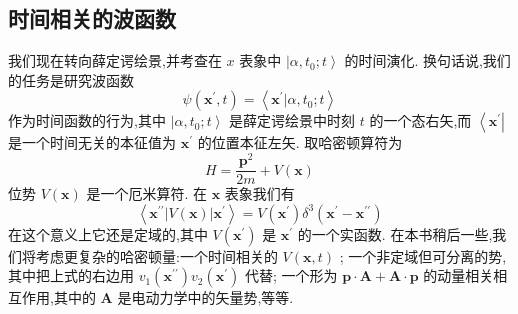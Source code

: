 \documentclass[lang=cn,newtx,10pt,scheme=chinese,thmcnt=section]{elegantbook}
\begin{document}
\subsection*{时间相关的波函数}
我们现在转向薛定谔绘景,并考查在 $x$ 表象中 $\left| {\alpha ,{t}_{0};t}\right\rangle$ 的时间演化. 换句话说,我们的任务是研究波函数
\begin{equation}
	\psi \left( {{\mathbf{x}}^{\prime }, t}\right) = \left\langle {{\mathbf{x}}^{\prime } | \alpha ,{t}_{0};t}\right\rangle
\end{equation}
作为时间函数的行为,其中 $\left| {\alpha ,{t}_{0};t}\right\rangle$ 是薛定谔绘景中时刻 $t$ 的一个态右矢,而 $\left\langle {\mathbf{x}}^{\prime }\right|$ 是一个时间无关的本征值为 ${\mathbf{x}}^{\prime }$ 的位置本征左矢. 取哈密顿算符为
\begin{equation}
	H = \frac{{\mathbf{p}}^{2}}{2m} + V\left( \mathbf{x}\right)
\end{equation}
位势 $V\left( \mathbf{x}\right)$ 是一个厄米算符. 在 $\mathbf{x}$ 表象我们有
\begin{equation}
	\left\langle {{\mathbf{x}}^{\prime \prime }\left| {V\left( \mathbf{x}\right) }\right| {\mathbf{x}}^{\prime }}\right\rangle = V\left( {\mathbf{x}}^{\prime }\right) {\delta }^{3}\left( {{\mathbf{x}}^{\prime } - {\mathbf{x}}^{\prime \prime }}\right)
\end{equation}
在这个意义上它还是定域的,其中 $V\left( {\mathbf{x}}^{\prime }\right)$ 是 ${\mathbf{x}}^{\prime }$ 的一个实函数. 在本书稍后一些,我们将考虑更复杂的哈密顿量:一个时间相关的 $V\left( {\mathbf{x}, t}\right)$ ; 一个非定域但可分离的势,其中把上式的右边用 ${v}_{1}\left( {\mathbf{x}}^{\prime \prime }\right) {v}_{2}\left( {\mathbf{x}}^{\prime }\right)$ 代替; 一个形为 $\mathbf{p} \cdot \mathbf{A} + \mathbf{A} \cdot \mathbf{p}$ 的动量相关相互作用,其中的 $\mathbf{A}$ 是电动力学中的矢量势,等等.
\end{document}
